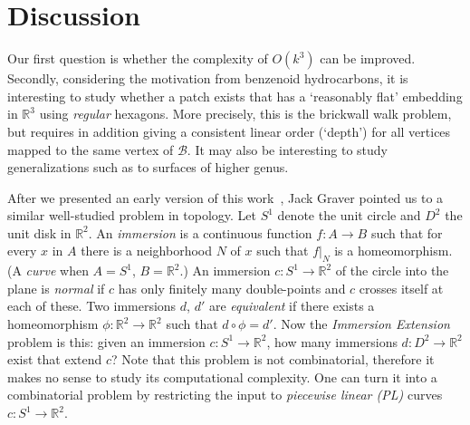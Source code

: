 \documentclass{llncs}
\newcommand{\BW}{\mathcal{B}}
\begin{document}
\section{Discussion}
\label{sec:discussion}


Our first question is whether the complexity of $O(k^3)$ can be improved.
Secondly, considering the motivation from benzenoid hydrocarbons, it is interesting to study whether a patch exists that has a `reasonably flat' embedding in $\mathbb{R}^3$ using {\em regular} hexagons. More precisely, this is the brickwall walk problem, but requires in addition giving a consistent linear order (`depth') for all vertices 
mapped to the same vertex of $\BW$.
It may also be interesting to study generalizations 
such as to surfaces of higher genus. 

After we presented an early version of this work~\cite{BB08}, Jack Graver 
pointed us to a similar well-studied problem in topology. 
Let $S^1$ denote the unit circle and $D^2$ the unit disk in $\mathbb{R}^2$. An {\em immersion} is a continuous function $f:A\rightarrow B$ such that for every $x$ in $A$ there is a neighborhood $N$ of $x$ such that $f|_N$ is a homeomorphism. 
(A {\em curve} when $A=S^1$, $B=\mathbb{R}^2$.)
An immersion $c:S^1\rightarrow \mathbb{R}^2$ of the circle into the plane is {\em normal} if $c$ has only finitely many double-points and $c$ crosses itself at each of these. Two immersions $d$, $d'$ are
{\em equivalent} if there exists a homeomorphism $\phi:\mathbb{R}^2\rightarrow \mathbb{R}^2$ such that $d \circ \phi = d'$.
Now the {\em Immersion Extension} problem is this: given an immersion $c:S^1\rightarrow \mathbb{R}^2$, how many immersions $d:D^2\rightarrow \mathbb{R}^2$ exist that extend $c$?  
Note that this problem is not combinatorial, therefore it makes no sense to study its computational complexity. One can turn it into a combinatorial problem by restricting the input to {\em piecewise linear (PL)} curves $c:S^1\rightarrow \mathbb{R}^2$.
\end{document}
